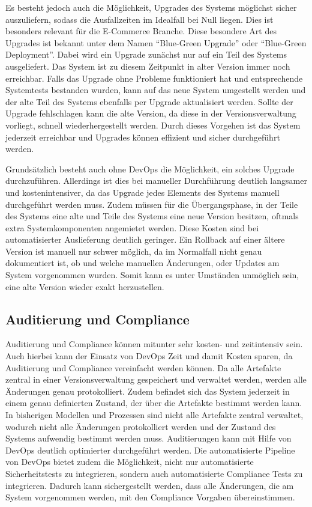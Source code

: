 Es besteht jedoch auch die Möglichkeit, Upgrades des Systems möglichst sicher auszuliefern, sodass die Ausfallzeiten im Idealfall bei Null liegen. 
Dies ist besonders relevant für die E-Commerce Branche. 
Diese besondere Art des Upgrades ist bekannt unter dem Namen \enquote{Blue-Green Upgrade} oder \enquote{Blue-Green Deployment}. 
Dabei wird ein Upgrade zunächst nur auf ein Teil des Systems ausgeliefert. Das System ist zu diesem Zeitpunkt in alter Version immer noch erreichbar. 
Falls das Upgrade ohne Probleme funktioniert hat und entsprechende Systemtests bestanden wurden, kann auf das neue System umgestellt werden und der alte Teil des Systems ebenfalls per Upgrade aktualisiert werden. 
Sollte der Upgrade fehlschlagen kann die alte Version, da diese in der Versionsverwaltung vorliegt, schnell wiederhergestellt werden. 
Durch dieses Vorgehen ist das System jederzeit erreichbar und Upgrades können effizient und sicher durchgeführt werden.
\parencite[Vgl.][S. 103 f.]{bass:2015}

Grundsätzlich besteht auch ohne DevOps die Möglichkeit, ein solches Upgrade durchzuführen. 
Allerdings ist dies bei manueller Durchführung deutlich langsamer und kostenintensiver, da das Upgrade jedes Elements des Systems manuell durchgeführt werden muss. 
Zudem müssen für die Übergangsphase, in der Teile des Systems eine alte und Teile des Systems eine neue Version besitzen, oftmals extra Systemkomponenten angemietet werden. 
Diese Kosten sind bei automatisierter Auslieferung deutlich geringer. 
Ein Rollback auf einer ältere Version ist manuell nur schwer möglich, da im Normalfall nicht genau dokumentiert ist, ob und welche manuellen Änderungen, oder Updates am System vorgenommen wurden. 
Somit kann es unter Umständen unmöglich sein, eine alte Version wieder exakt herzustellen. \parencite[Vgl.][S. 23]{fisher-miranda:2014}

\subsection{Auditierung und Compliance}
Auditierung und Compliance können mitunter sehr kosten- und zeitintensiv sein. Auch hierbei kann der Einsatz von DevOps Zeit und damit Kosten sparen, da Auditierung und Compliance vereinfacht werden können. 
Da alle Artefakte zentral in einer Versionsverwaltung gespeichert und verwaltet werden, werden alle Änderungen genau protokolliert. 
Zudem befindet sich das System jederzeit in einem genau definierten Zustand, der über die Artefakte bestimmt werden kann. 
In bisherigen Modellen und Prozessen sind nicht alle Artefakte zentral verwaltet, wodurch nicht alle Änderungen protokolliert werden und der Zustand des Systems aufwendig bestimmt werden muss. 
Auditierungen kann mit Hilfe von DevOps deutlich optimierter durchgeführt werden. 
Die automatisierte Pipeline von DevOps bietet zudem die Möglichkeit, nicht nur automatisierte Sicherheitstests zu integrieren, sondern auch automatisierte Compliance Tests zu integrieren. 
Dadurch kann sichergestellt werden, dass alle Änderungen, die am System vorgenommen werden, mit den Compliance Vorgaben übereinstimmen. \parencite[Vgl.][S. 24]{fisher-miranda:2014}

